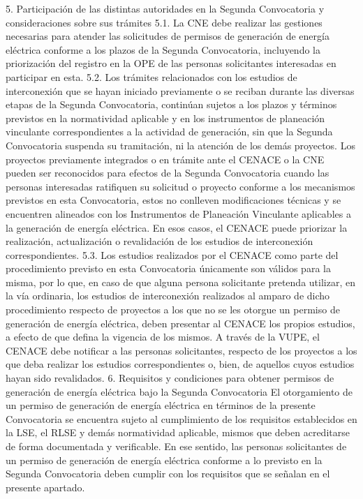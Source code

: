 5. Participación de las distintas autoridades en la Segunda Convocatoria y consideraciones sobre sus trámites
5.1. La CNE debe realizar las gestiones necesarias para atender las solicitudes de permisos de generación de energía eléctrica conforme a los plazos de la Segunda Convocatoria, incluyendo la priorización del registro en la OPE de las personas solicitantes interesadas en participar en esta.
5.2. Los trámites relacionados con los estudios de interconexión que se hayan iniciado previamente o se reciban durante las diversas etapas de la Segunda Convocatoria, continúan sujetos a los plazos y términos previstos en la normatividad aplicable y en los instrumentos de planeación vinculante correspondientes a la actividad de generación, sin que la Segunda Convocatoria suspenda su tramitación, ni la atención de los demás proyectos.
Los proyectos previamente integrados o en trámite ante el CENACE o la CNE pueden ser reconocidos para efectos de la Segunda Convocatoria cuando las personas interesadas ratifiquen su solicitud o proyecto conforme a los mecanismos previstos en esta Convocatoria, estos no conlleven modificaciones técnicas y se encuentren alineados con los Instrumentos de Planeación Vinculante aplicables a la generación de energía eléctrica. En esos casos, el CENACE puede priorizar la realización, actualización o revalidación de los estudios de interconexión correspondientes.
5.3. Los estudios realizados por el CENACE como parte del procedimiento previsto en esta Convocatoria únicamente son válidos para la misma, por lo que, en caso de que alguna persona solicitante pretenda utilizar, en la vía ordinaria, los estudios de interconexión realizados al amparo de dicho procedimiento respecto de proyectos a los que no se les otorgue un permiso de generación de energía eléctrica, deben presentar al CENACE los propios estudios, a efecto de que defina la vigencia de los mismos.
A través de la VUPE, el CENACE debe notificar a las personas solicitantes, respecto de los proyectos a los que deba realizar los estudios correspondientes o, bien, de aquellos cuyos estudios hayan sido revalidados.
6. Requisitos y condiciones para obtener permisos de generación de energía eléctrica bajo la Segunda Convocatoria
El otorgamiento de un permiso de generación de energía eléctrica en términos de la presente Convocatoria se encuentra sujeto al cumplimiento de los requisitos establecidos en la LSE, el RLSE y demás normatividad aplicable, mismos que deben acreditarse de forma documentada y verificable. En ese sentido, las personas solicitantes de un permiso de generación de energía eléctrica conforme a lo previsto en la Segunda Convocatoria deben cumplir con los requisitos que se señalan en el presente apartado.
